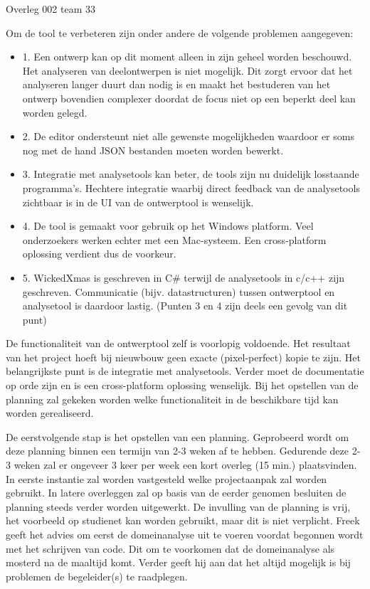 \documentclass{article}
\begin{document}
\begin{Minutes}{Overleg 002 team 33}

Om de tool te verbeteren zijn onder andere de volgende problemen aangegeven:
\begin{itemize}
 \item 1. Een ontwerp kan op dit moment alleen in zijn geheel worden beschouwd.
Het analyseren van deelontwerpen is niet mogelijk. Dit zorgt ervoor dat het analyseren 
langer duurt dan nodig is en maakt het bestuderen van het ontwerp bovendien complexer
doordat de focus niet op een beperkt deel kan worden gelegd.
 \item 2. De editor ondersteunt niet alle gewenste mogelijkheden waardoor er soms nog met de hand JSON bestanden moeten worden bewerkt.
 \item 3. Integratie met analysetools kan beter, de tools zijn nu duidelijk losstaande programma's. Hechtere integratie waarbij direct
 feedback van de analysetools zichtbaar is in de UI van de ontwerptool is wenselijk.
 \item 4. De tool is gemaakt voor gebruik op het Windows platform. Veel onderzoekers werken echter met een Mac-systeem.
 Een cross-platform oplossing verdient dus de voorkeur.
 \item 5. WickedXmas is geschreven in C\# terwijl de analysetools in c/c++ zijn geschreven. Communicatie (bijv. datastructuren) tussen
 ontwerptool en analysetool is daardoor lastig. (Punten 3 en 4 zijn deels een gevolg van dit punt)
\end{itemize}

De functionaliteit van de ontwerptool zelf is voorlopig voldoende. Het resultaat van het project hoeft bij nieuwbouw geen exacte (pixel-perfect) kopie te zijn.
Het belangrijkste punt is de integratie met analysetools. Verder moet de documentatie op orde zijn en is een cross-platform oplossing wenselijk. Bij het opstellen
van de planning zal gekeken worden welke functionaliteit in de beschikbare tijd kan worden gerealiseerd.


De eerstvolgende stap is het opstellen van een planning. Geprobeerd wordt om deze planning binnen een termijn van 2-3 weken af te hebben.
Gedurende deze 2-3 weken zal er ongeveer 3 keer per week een kort overleg (15 min.) plaatsvinden. In eerste instantie zal worden vastgesteld
welke projectaanpak zal worden gebruikt. In latere overleggen zal op basis van de eerder genomen besluiten de planning steeds verder worden uitgewerkt.
De invulling van de planning is vrij, het voorbeeld op studienet kan worden gebruikt, maar dit is niet verplicht. Freek geeft het advies om eerst
de domeinanalyse uit te voeren voordat begonnen wordt met het schrijven van code. Dit om te voorkomen dat de domeinanalyse als mosterd na de maaltijd komt.
Verder geeft hij aan dat het altijd mogelijk is bij problemen de begeleider(s) te raadplegen.



\end{Minutes}
\end{document}
